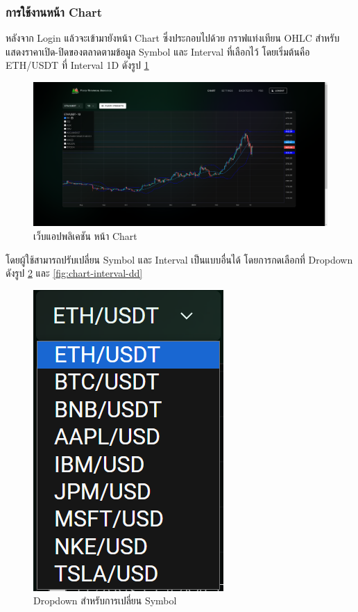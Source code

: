 \subsubsection{การใช้งานหน้า Chart}
หลังจาก Login แล้วจะเข้ามายังหน้า Chart ซึ่งประกอบไปด้วย กราฟแท่งเทียน OHLC สำหรับแสดงราคาเปิด-ปิดของตลาดตามข้อมูล Symbol และ Interval ที่เลือกไว้ โดยเริ่มต้นคือ ETH/USDT ที่ Interval 1D ดังรูป \ref{fig:chart-ohlc}
\begin{figure}[ht]
    \centering
    \includegraphics[width=\textwidth]{images/web-tuts/chart-ohlc.PNG}
    \caption{เว็บแอปพลิเคชัน หน้า Chart}
    \label{fig:chart-ohlc}
\end{figure}
\FloatBarrier
โดยผู้ใช้สามารถปรับเปลี่ยน Symbol และ Interval เป็นแบบอื่นได้ โดยการกดเลือกที่ Dropdown ดังรูป \ref{fig:chart-symbol-dd} และ \ref{fig:chart-interval-dd}
\begin{figure}[ht]
    \centering
    \includegraphics[scale=0.75]{images/web-tuts/chart-symbol-dd.PNG}
    \caption{Dropdown สำหรับการเปลี่ยน Symbol}
    \label{fig:chart-symbol-dd}
\end{figure}
